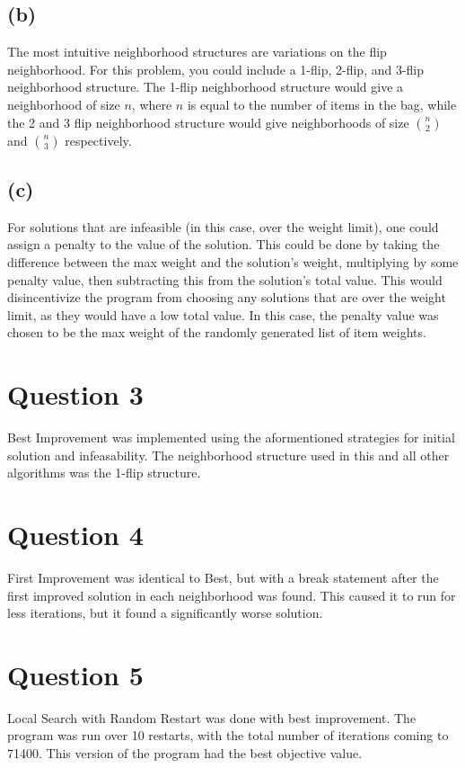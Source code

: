 \documentclass[12pt, letterpaper]{article}
\begin{document}
\subsection*{(b)}
The most intuitive neighborhood structures are variations on the flip neighborhood. For this problem, you could include a 1-flip, 2-flip, and 3-flip neighborhood structure. The 1-flip neighborhood structure would give a neighborhood of size $n$, where $n$ is equal to the number of items in the bag, while the 2 and 3 flip neighborhood structure would give neighborhoods of size ${n \choose 2}$ and ${n \choose 3}$ respectively.

\subsection*{(c)}
For solutions that are infeasible (in this case, over the weight limit), one could assign a penalty to the value of the solution. This could be done by taking the difference between the max weight and the solution's weight, multiplying by some penalty value, then subtracting this from the solution's total value. This would disincentivize the program from choosing any solutions that are over the weight limit, as they would have a low total value. In this case, the penalty value was  chosen to be the max weight of the randomly generated list of item weights. 


\section*{Question 3}

Best Improvement was implemented using the aformentioned strategies for initial solution and infeasability. The neighborhood structure used in this and all other algorithms was the 1-flip structure. 

\section*{Question 4}

First Improvement was identical to Best, but with a break statement after the first improved solution in each neighborhood was found. This caused it to run for less iterations, but it found a significantly worse solution.
\section*{Question 5}

Local Search with Random Restart was done with best improvement. The program was run over 10 restarts, with the total number of iterations coming to 71400. This version of the program had the best objective value.
\end{document}
